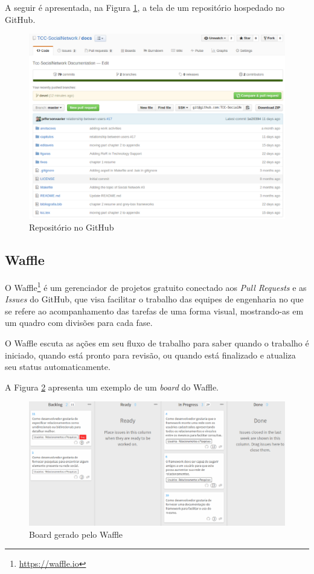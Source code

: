 A seguir é apresentada, na Figura \ref{github}, a tela de um repositório hospedado no GitHub.

\begin{figure}[!h]
	\centering
	\includegraphics[scale=0.35]{figuras/suporte_tecnologico/github.eps}
	\caption{Repositório no GitHub}
	\label{github}
\end{figure}

\subsection{Waffle}

O Waffle\footnote{\url{https://waffle.io}} é um gerenciador de projetos gratuito conectado aos \textit{Pull Requests} e as \textit{Issues} do GitHub, que visa facilitar o trabalho das equipes de engenharia no que se refere ao acompanhamento das tarefas de uma forma visual, mostrando-as em um quadro com divisões para cada fase.

O Waffle escuta as ações em seu fluxo de trabalho para saber quando o trabalho é iniciado, quando está pronto para revisão, ou quando está finalizado e atualiza seu status automaticamente.

A Figura \ref{waffle} apresenta um exemplo de um \textit{board} do Waffle.

\newpage

\begin{figure}[!h]
	\centering
	\includegraphics[scale=0.3]{figuras/suporte_tecnologico/waffle.eps}
	\caption{Board gerado pelo Waffle}
	\label{waffle}
\end{figure}

